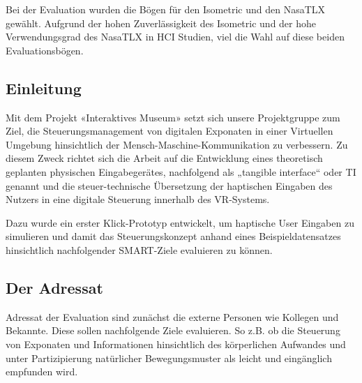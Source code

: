 \documentclass[runningheads,a4paper, 12pt]{llncs}
\begin{document}
Bei der Evaluation wurden die Bögen für den Isometric und den NasaTLX gewählt. Aufgrund der hohen Zuverlässigkeit des Isometric und der hohe Verwendungsgrad des NasaTLX in HCI Studien, viel die Wahl auf diese beiden Evaluationsbögen.\\

\subsection{Einleitung}
Mit dem Projekt «Interaktives Museum» setzt sich unsere Projektgruppe zum Ziel, die Steuerungsmanagement von digitalen Exponaten in einer Virtuellen Umgebung hinsichtlich der Mensch-Maschine-Kommunikation zu verbessern.
Zu diesem Zweck richtet sich die Arbeit auf die Entwicklung eines theoretisch geplanten physischen Eingabegerätes, nachfolgend als „tangible interface“ oder TI genannt und die steuer-technische Übersetzung der haptischen Eingaben des Nutzers in eine digitale Steuerung innerhalb des VR-Systems.

Dazu wurde ein erster Klick-Prototyp entwickelt, um haptische User Eingaben zu simulieren und damit das Steuerungskonzept anhand eines Beispieldatensatzes hinsichtlich nachfolgender SMART-Ziele evaluieren zu können.

\subsection{Der Adressat}
Adressat der Evaluation sind zunächst die externe Personen wie Kollegen und  Bekannte. Diese sollen nachfolgende Ziele evaluieren. So z.B. ob die Steuerung von Exponaten und Informationen hinsichtlich des körperlichen Aufwandes und unter Partizipierung natürlicher Bewegungsmuster als leicht und eingänglich empfunden wird.
\end{document}
